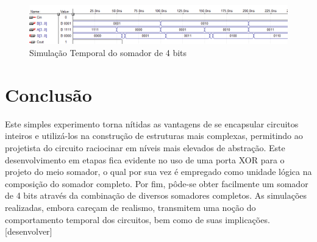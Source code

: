 \documentclass[a4paper]{article}
\begin{document}
\begin{figure}[h]
  \centering
  \includegraphics[scale=0.4]{sim_temp_4bit-2.png}
  \caption{Simulação Temporal do somador de 4 bits}
\end{figure}


\FloatBarrier
\section{Conclusão}
	Este simples experimento torna nítidas as vantagens de se encapsular 
circuitos inteiros e utilizá-los na construção de estruturas mais complexas,
permitindo ao projetista do circuito raciocinar em níveis mais elevados de
abstração. Este desenvolvimento em etapas fica evidente no uso de uma porta
XOR para o projeto do meio somador, o qual por sua vez é empregado como unidade
lógica na composição do somador completo. Por fim, pôde-se obter facilmente
um somador de 4 bits através da combinação de diversos somadores completos.
	As simulações realizadas, embora careçam de realismo, transmitem uma
noção do comportamento temporal dos circuitos, bem como de suas implicações. [desenvolver]
\end{document}
